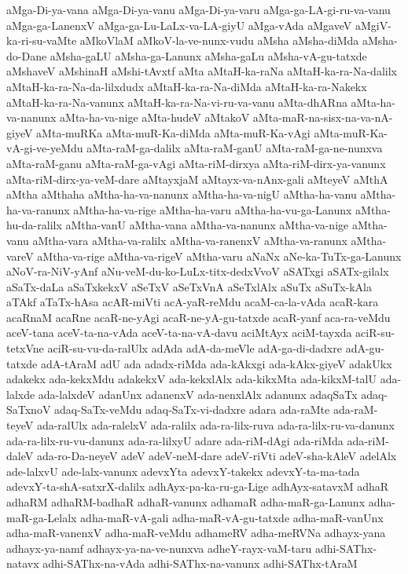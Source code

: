 {aMga-Di-ya-vana
aMga-Di-ya-vanu
aMga-Di-ya-varu
aMga-ga-LA-gi-ru-va-vanu
aMga-ga-LanenxV
aMga-ga-Lu-LaLx-va-LA-giyU
aMga-vAda
aMgaveV
aMgiV-ka-ri-su-vaMte
aMkoVlaM
aMkoV-la-ve-nunx-vudu
aMsha
aMsha-diMda
aMsha-do-Dane
aMsha-gaLU
aMsha-ga-Lanunx
aMsha-gaLu
aMsha-vA-gu-tatxde
aMshaveV
aMshinaH
aMshi-tAvxtf
aMta
aMtaH-ka-raNa
aMtaH-ka-ra-Na-dalilx
aMtaH-ka-ra-Na-da-lilxdudx
aMtaH-ka-ra-Na-diMda
aMtaH-ka-ra-Nakekx
aMtaH-ka-ra-Na-vanunx
aMtaH-ka-ra-Na-vi-ru-va-vanu
aMta-dhARna
aMta-ha-va-nanunx
aMta-ha-va-nige
aMta-hudeV
aMtakoV
aMta-maR-na-sisx-na-va-nA-giyeV
aMta-muRKa
aMta-muR-Ka-diMda
aMta-muR-Ka-vAgi
aMta-muR-Ka-vA-gi-ve-yeMdu
aMta-raM-ga-dalilx
aMta-raM-ganU
aMta-raM-ga-ne-nunxva
aMta-raM-ganu
aMta-raM-ga-vAgi
aMta-riM-dirxya
aMta-riM-dirx-ya-vanunx
aMta-riM-dirx-ya-veM-dare
aMtayxjaM
aMtayx-va-nAnx-gali
aMteyeV
aMthA
aMtha
aMthaha
aMtha-ha-va-nanunx
aMtha-ha-va-nigU
aMtha-ha-vanu
aMtha-ha-va-ranunx
aMtha-ha-va-rige
aMtha-ha-varu
aMtha-ha-vu-ga-Lanunx
aMtha-hu-da-ralilx
aMtha-vanU
aMtha-vana
aMtha-va-nanunx
aMtha-va-nige
aMtha-vanu
aMtha-vara
aMtha-va-ralilx
aMtha-va-ranenxV
aMtha-va-ranunx
aMtha-vareV
aMtha-va-rige
aMtha-va-rigeV
aMtha-varu
aNaNx
aNe-ka-TuTx-ga-Lanunx
aNoV-ra-NiV-yAnf
aNu-veM-du-ko-LuLx-titx-dedxVvoV
aSATxgi
aSATx-gilalx
aSaTx-daLa
aSaTxkekxV
aSeTxV
aSeTxVnA
aSeTxlAlx
aSuTx
aSuTx-kAla
aTAkf
aTaTx-hAsa
acAR-miVti
acA-yaR-reMdu
acaM-ca-la-vAda
acaR-kara
acaRnaM
acaRne
acaR-ne-yAgi
acaR-ne-yA-gu-tatxde
acaR-yanf
aca-ra-veMdu
aceV-tana
aceV-ta-na-vAda
aceV-ta-na-vA-davu
aciMtAyx
aciM-tayxda
aciR-su-tetxVne
aciR-su-vu-da-ralUlx
adAda
adA-da-meVle
adA-ga-di-dadxre
adA-gu-tatxde
adA-tAraM
adU
ada
adadx-riMda
ada-kAkxgi
ada-kAkx-giyeV
adakUkx
adakekx
ada-kekxMdu
adakekxV
ada-kekxlAlx
ada-kikxMta
ada-kikxM-talU
ada-lalxde
ada-lalxdeV
adanUnx
adanenxV
ada-nenxlAlx
adanunx
adaqSaTx
adaq-SaTxnoV
adaq-SaTx-veMdu
adaq-SaTx-vi-dadxre
adara
ada-raMte
ada-raM-teyeV
ada-ralUlx
ada-ralelxV
ada-ralilx
ada-ra-lilx-ruva
ada-ra-lilx-ru-va-danunx
ada-ra-lilx-ru-vu-danunx
ada-ra-lilxyU
adare
ada-riM-dAgi
ada-riMda
ada-riM-daleV
ada-ro-Da-neyeV
adeV
adeV-neM-dare
adeV-riVti
adeV-sha-kAleV
adelAlx
ade-lalxvU
ade-lalx-vanunx
adevxYta
adevxY-takekx
adevxY-ta-ma-tada
adevxY-ta-shA-satxrX-dalilx
adhAyx-pa-ka-ru-ga-Lige
adhAyx-satavxM
adhaR
adhaRM
adhaRM-badhaR
adhaR-vanunx
adhamaR
adha-maR-ga-Lanunx
adha-maR-ga-Lelalx
adha-maR-vA-gali
adha-maR-vA-gu-tatxde
adha-maR-vanUnx
adha-maR-vanenxV
adha-maR-veMdu
adhameRV
adha-meRVNa
adhayx-yana
adhayx-ya-namf
adhayx-ya-na-ve-nunxva
adheY-rayx-vaM-taru
adhi-SAThx-natavx
adhi-SAThx-na-vAda
adhi-SAThx-na-vanunx
adhi-SAThx-tAraM
}
